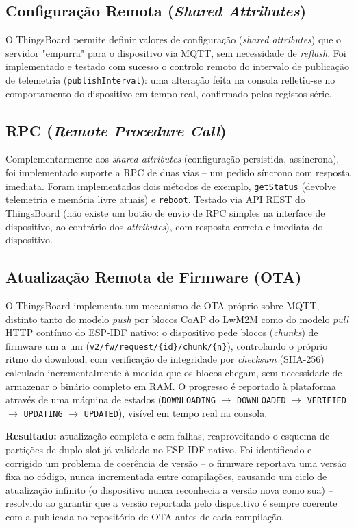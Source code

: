 \documentclass[a4paper,12pt]{article}
\begin{document}
\subsection{Configuração Remota (\textit{Shared Attributes})}
O ThingsBoard permite definir valores de configuração (\textit{shared attributes}) que o servidor "empurra" para o dispositivo via MQTT, sem necessidade de \textit{reflash}. Foi implementado e testado com sucesso o controlo remoto do intervalo de publicação de telemetria (\texttt{publishInterval}): uma alteração feita na consola refletiu-se no comportamento do dispositivo em tempo real, confirmado pelos registos série.

\subsection{RPC (\textit{Remote Procedure Call})}
Complementarmente aos \textit{shared attributes} (configuração persistida, assíncrona), foi implementado suporte a RPC de duas vias -- um pedido síncrono com resposta imediata. Foram implementados dois métodos de exemplo, \texttt{getStatus} (devolve telemetria e memória livre atuais) e \texttt{reboot}. Testado via API REST do ThingsBoard (não existe um botão de envio de RPC simples na interface de dispositivo, ao contrário dos \textit{attributes}), com resposta correta e imediata do dispositivo.

\subsection{Atualização Remota de Firmware (OTA)}
O ThingsBoard implementa um mecanismo de OTA próprio sobre MQTT, distinto tanto do modelo \textit{push} por blocos CoAP do LwM2M como do modelo \textit{pull} HTTP contínuo do ESP-IDF nativo: o dispositivo pede blocos (\textit{chunks}) de firmware um a um (\texttt{v2/fw/request/\{id\}/chunk/\{n\}}), controlando o próprio ritmo do download, com verificação de integridade por \textit{checksum} (SHA-256) calculado incrementalmente à medida que os blocos chegam, sem necessidade de armazenar o binário completo em RAM. O progresso é reportado à plataforma através de uma máquina de estados (\texttt{DOWNLOADING} $\rightarrow$ \texttt{DOWNLOADED} $\rightarrow$ \texttt{VERIFIED} $\rightarrow$ \texttt{UPDATING} $\rightarrow$ \texttt{UPDATED}), visível em tempo real na consola.

\textbf{Resultado:} atualização completa e sem falhas, reaproveitando o esquema de partições de duplo slot já validado no ESP-IDF nativo. Foi identificado e corrigido um problema de coerência de versão -- o firmware reportava uma versão fixa no código, nunca incrementada entre compilações, causando um ciclo de atualização infinito (o dispositivo nunca reconhecia a versão nova como sua) -- resolvido ao garantir que a versão reportada pelo dispositivo é sempre coerente com a publicada no repositório de OTA antes de cada compilação.
\end{document}
